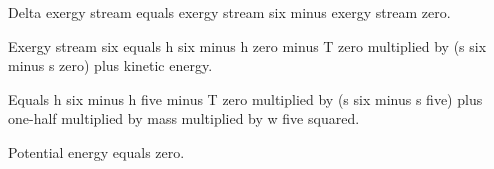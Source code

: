 Delta exergy stream equals exergy stream six minus exergy stream zero.  

Exergy stream six equals h six minus h zero minus T zero multiplied by (s six minus s zero) plus kinetic energy.  

Equals h six minus h five minus T zero multiplied by (s six minus s five) plus one-half multiplied by mass multiplied by w five squared.  

Potential energy equals zero.